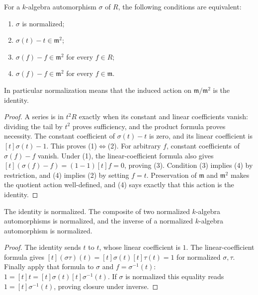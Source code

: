\begin{lemma}
\label{lem:normalization-iff}
\leanok
For a $k$-algebra automorphism $\sigma$ of $R$, the following conditions
are equivalent:
\begin{enumerate}
\item $\sigma$ is normalized;
\item $\sigma(t)-t\in\mathfrak m^2$;
\item $\sigma(f)-f\in\mathfrak m^2$ for every $f\in R$;
\item $\sigma(f)-f\in\mathfrak m^2$ for every $f\in\mathfrak m$.
\end{enumerate}
In particular normalization means that the induced action on
$\mathfrak m/\mathfrak m^2$ is the identity.
\end{lemma}

\begin{proof}
A series is in $t^2R$ exactly when its constant and linear
coefficients vanish: dividing the tail by $t^2$ proves sufficiency,
and the product formula proves necessity.
The constant coefficient of $\sigma(t)-t$ is zero, and its linear
coefficient is $[t]\sigma(t)-1$. This proves (1)$\Leftrightarrow$(2).
For arbitrary $f$, constant coefficients of $\sigma(f)-f$ vanish.
Under (1), the linear-coefficient formula also gives
$[t](\sigma(f)-f)=(1-1)[t]f=0$, proving (3).
Condition (3) implies (4) by restriction, and (4) implies (2) by
setting $f=t$. Preservation of $\mathfrak m$ and $\mathfrak m^2$
makes the quotient action well-defined, and (4) says exactly that
this action is the identity.
\end{proof}

\begin{lemma}
\label{lem:normalized-aut-closure}
\leanok
The identity is normalized. The composite of two normalized
$k$-algebra automorphisms is normalized, and the inverse of a normalized
$k$-algebra automorphism is normalized.
\end{lemma}

\begin{proof}
The identity sends $t$ to $t$, whose linear coefficient is $1$.
The linear-coefficient formula gives
$[t](\sigma\tau)(t)=[t]\sigma(t)[t]\tau(t)=1$ for normalized
$\sigma,\tau$. Finally apply that formula to $\sigma$ and
$f=\sigma^{-1}(t)$:
$1=[t]t=[t]\sigma(t)[t]\sigma^{-1}(t)$.
If $\sigma$ is normalized this equality reads
$1=[t]\sigma^{-1}(t)$, proving closure under inverse.
\end{proof}

